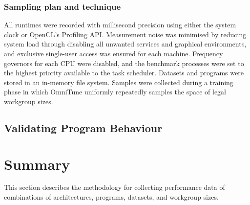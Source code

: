 \subsubsection{Sampling plan and technique}

All runtimes were recorded with millisecond precision using either the
system clock or OpenCL's Profiling API. Measurement noise was
minimised by reducing system load through disabling all unwanted
services and graphical environments, and exclusive single-user access
was ensured for each machine. Frequency governors for each CPU were
disabled, and the benchmark processes were set to the highest priority
available to the task scheduler. Datasets and programs were stored in
an in-memory file system. Samples were collected during a training
phase in which OmniTune uniformly repeatedly samples the space of
legal workgroup sizes.


\subsection{Validating Program Behaviour}


\section{Summary}

This section describes the methodology for collecting performance data
of  combinations of architectures,
programs, datasets, and workgroup sizes.
